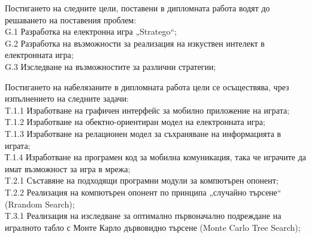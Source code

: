Постигането на следните цели, поставени в дипломната работа водят до решаването на поставения проблем: \\
G.1 Разработка на електронна игра „Stratego“; \\
G.2 Разработка на възможности за реализация на изкуствен интелект в електронната игра; \\
G.3 Изследване на възможностите за различни стратегии;

Постигането на набелязаните в дипломната работа цели се осъществява, чрез изпълнението на следните задачи: \\
T.1.1 Изработване на графичен интерфейс за мобилно приложение на играта; \\
T.1.2 Изработване на обектно-ориентиран модел на електронната игра; \\
T.1.3 Изработване на релационен модел за съхраняване на информацията в играта; \\
Т.1.4 Изработване на програмен код за мобилна комуникация, така че играчите да имат възможност за игра в мрежа; \\
T.2.1 Съставяне на подходящи програмни модули за компютърен опонент; \\
T.2.2 Реализация на компютърен опонент по принципа „случайно търсене“ (Rrandom Search); \\
T.3.1 Реализация на изследване за оптимално първоначално подреждане на игралното табло с Монте Карло дървовидно търсене (Monte Carlo Tree Search); \\

